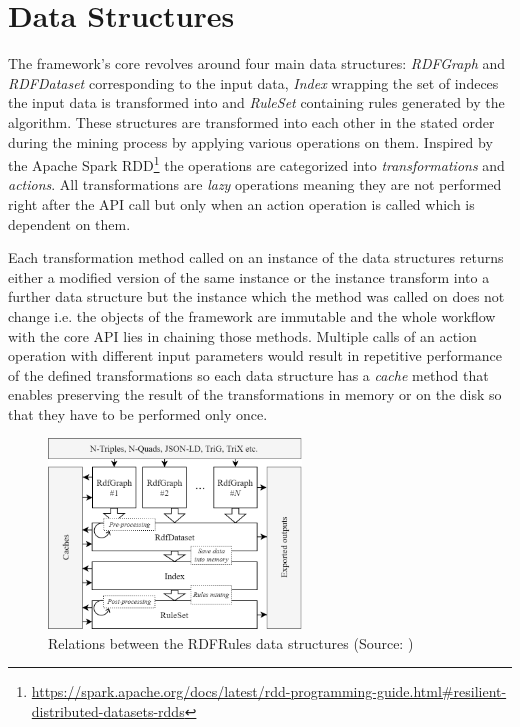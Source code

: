 \section{Data Structures}

The framework's core revolves around four main data structures: \textit{RDFGraph} and \textit{RDFDataset} corresponding to the input data, \textit{Index} wrapping the set of indeces the input data is transformed into and \textit{RuleSet} containing rules generated by the algorithm. These structures are transformed into each other in the stated order during the mining process by applying various operations on them. Inspired by the Apache Spark RDD\footnote{\href{https://spark.apache.org/docs/latest/rdd-programming-guide.html\#resilient-distributed-datasets-rdds}{https://spark.apache.org/docs/latest/rdd-programming-guide.html\#resilient-distributed-datasets-rdds}} the operations are categorized into \textit{transformations} and \textit{actions}. All transformations are \textit{lazy} operations meaning they are not performed right after the API call but only when an action operation is called which is dependent on them.

Each transformation method called on an instance of the data structures returns either a modified version of the same instance or the instance transform into a further data structure but the instance which the method was called on does not change i.e. the objects of the framework are immutable and the whole workflow with the core API lies in chaining those methods. Multiple calls of an action operation with different input parameters would result in repetitive performance of the defined transformations so each data structure has a \textit{cache} method that enables preserving the result of the transformations in memory or on the disk so that they have to be performed only once.

\begin{figure}[h]
\centering
\includegraphics[width=0.6\textwidth]{img/rdfrules-abstractions.png}
\caption{Relations between the RDFRules data structures (Source: \cite{Zeman2018})}
\label{rdfrulesdatastructures}
\end{figure}


